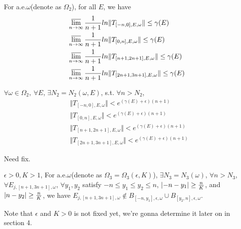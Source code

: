\begin{thm}
  For a.e.$\omega$(denote as $\Omega_2$), for all $E$, we have
  \[
    \begin{aligned}
      &\varlimsup_{n\to\infty} \frac{1}{n+1} ln\Vert T_{[-n,0],E,\omega}\Vert\leq\gamma(E)\\
      &\varlimsup_{n\to\infty} \frac{1}{n+1} ln\Vert T_{[0,n],E,\omega}\Vert\leq\gamma(E)\\
      &\varlimsup_{n\to\infty} \frac{1}{n+1} ln\Vert T_{[n+1,2n+1],E,\omega}\Vert\leq\gamma(E)\\
      &\varlimsup_{n\to\infty} \frac{1}{n+1} ln\Vert T_{[2n+1,3n+1],E,\omega}\Vert\leq\gamma(E)
    \end{aligned}
  \]
\end{thm}
\begin{cor}\label{omega2}
  $\forall \omega\in\Omega_2,~\forall E$, $\exists N_2=N_2(\omega,E)$, s.t. $\forall n>N_2$,
  \[
    \begin{aligned}
      &\Vert T_{[-n,0],E,\omega}\Vert< e^{(\gamma(E)+\epsilon)(n+1)}\\
      &\Vert T_{[0,n],E,\omega}\Vert< e^{(\gamma(E)+\epsilon)(n+1)}\\
      &\Vert T_{[n+1,2n+1],E,\omega}\Vert< e^{(\gamma(E)+\epsilon)(n+1)}\\
      &\Vert T_{[2n+1,3n+1],E,\omega}\Vert< e^{(\gamma(E)+\epsilon)(n+1)}
    \end{aligned}
  \]
\end{cor}
\begin{remark}
  Need fix.
\end{remark}
\begin{thm}\label{omega3}
   $\epsilon>0,K>1$, For a.e.$\omega$(denote as $\Omega_3=\Omega_3(\epsilon,K)$), $\exists N_3=N_3(\omega)$, $\forall n>N_3$, $\forall E_{j,[n+1,3n+1],\omega}$, $\forall y_1,y_2$ satisfy $-n\leq y_1\leq y_2\leq n$,  $\lvert-n-y_1\rvert\geq\frac{n}{K}$, and $\lvert n-y_2\rvert\geq\frac{n}{K}$,
 we have $E_{j,[n+1,3n+1],\omega}\notin B_{[-n,y_1],\epsilon,\omega}\cup B_{[y_2,n],\epsilon,\omega}$.
\end{thm}
\begin{remark}
  Note that $\epsilon$ and $K>0$ is not fixed yet, we're gonna determine it later on in section 4.
\end{remark}

